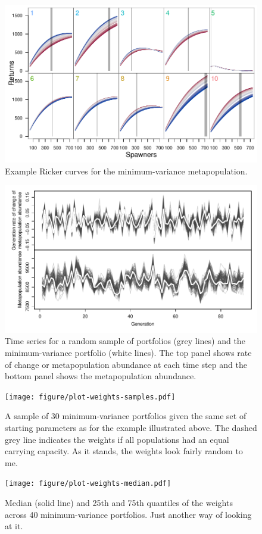 \documentclass[12pt]{article}
\begin{document}
\begin{figure}[htbp]
\centering
\includegraphics{figure/unnamed-chunk-1.pdf}
\caption{Example Ricker curves for the minimum-variance metapopulation.}
\end{figure}

\begin{figure}[htbp]
\centering
\includegraphics{figure/plot-portfolio-timeseries.pdf}
\caption{Time series for a random sample of portfolios (grey lines) and
the minimum-variance portfolio (white lines). The top panel shows rate
of change or metapopulation abundance at each time step and the bottom
panel shows the metapopulation abundance.}
\end{figure}

\begin{figure}[htbp]
\centering
\texttt{[image: figure/plot-weights-samples.pdf]}
\caption{A sample of 30 minimum-variance portfolios given the same set
of starting parameters as for the example illustrated above. The dashed
grey line indicates the weights if all populations had an equal carrying
capacity. As it stands, the weights look fairly random to me.}
\end{figure}

\begin{figure}[htbp]
\centering
\texttt{[image: figure/plot-weights-median.pdf]}
\caption{Median (solid line) and 25th and 75th quantiles of the weights
across 40 minimum-variance portfolios. Just another way of looking at
it.}
\end{figure}

\clearpage

\renewcommand\refname{References}

\end{document}
